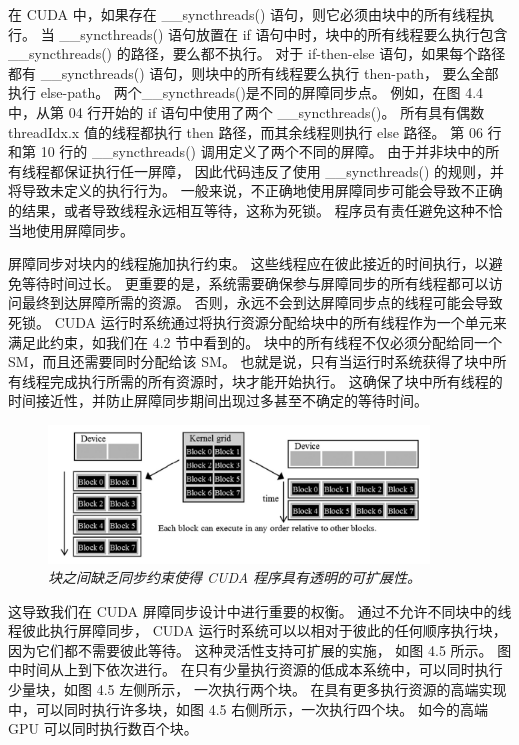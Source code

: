在 CUDA 中，如果存在 \_\_syncthreads() 语句，则它必须由块中的所有线程执行。 
当 \_\_syncthreads() 语句放置在 if 语句中时，块中的所有线程要么执行包含 \_\_syncthreads() 的路径，要么都不执行。 
对于 if-then-else 语句，如果每个路径都有 \_\_syncthreads() 语句，则块中的所有线程要么执行 then-path，
要么全部执行 else-path。 两个\_\_syncthreads()是不同的屏障同步点。 
例如，在图 4.4 中，从第 04 行开始的 if 语句中使用了两个 \_\_syncthreads()。
所有具有偶数 threadIdx.x 值的线程都执行 then 路径，而其余线程则执行 else 路径。 
第 06 行和第 10 行的 \_\_syncthreads() 调用定义了两个不同的屏障。 由于并非块中的所有线程都保证执行任一屏障，
因此代码违反了使用 \_\_syncthreads() 的规则，并将导致未定义的执行行为。 
一般来说，不正确地使用屏障同步可能会导致不正确的结果，或者导致线程永远相互等待，这称为死锁。 
程序员有责任避免这种不恰当地使用屏障同步。

屏障同步对块内的线程施加执行约束。 这些线程应在彼此接近的时间执行，以避免等待时间过长。 
更重要的是，系统需要确保参与屏障同步的所有线程都可以访问最终到达屏障所需的资源。 
否则，永远不会到达屏障同步点的线程可能会导致死锁。 
CUDA 运行时系统通过将执行资源分配给块中的所有线程作为一个单元来满足此约束，如我们在 4.2 节中看到的。 
块中的所有线程不仅必须分配给同一个 SM，而且还需要同时分配给该 SM。 
也就是说，只有当运行时系统获得了块中所有线程完成执行所需的所有资源时，块才能开始执行。 
这确保了块中所有线程的时间接近性，并防止屏障同步期间出现过多甚至不确定的等待时间。

\begin{figure}[H]
	\centering
	\includegraphics[width=0.9\textwidth]{figs/F4.5.png}
	\caption{\textit{块之间缺乏同步约束使得 CUDA 程序具有透明的可扩展性。}}
\end{figure}

这导致我们在 CUDA 屏障同步设计中进行重要的权衡。 通过不允许不同块中的线程彼此执行屏障同步，
CUDA 运行时系统可以以相对于彼此的任何顺序执行块，因为它们都不需要彼此等待。 这种灵活性支持可扩展的实施，
如图 4.5 所示。 图中时间从上到下依次进行。 在只有少量执行资源的低成本系统中，可以同时执行少量块，如图 4.5 左侧所示，
一次执行两个块。 在具有更多执行资源的高端实现中，可以同时执行许多块，如图 4.5 右侧所示，一次执行四个块。 
如今的高端 GPU 可以同时执行数百个块。

